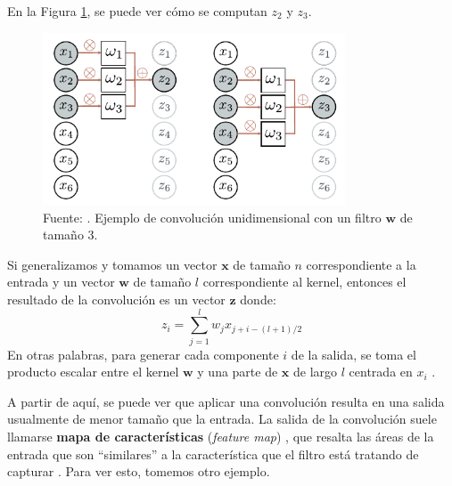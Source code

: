 \documentclass[../../main.tex]{subfiles}
\begin{document}
En la Figura \ref{fig:conv1d-example}, se puede ver cómo se computan \(z_2\) y \(z_3\).

\begin{figure}
    \centering
    \includegraphics[width=0.8\textwidth]{figs/conv1d-example1.png}
    \caption{Fuente: \cite{prince2024understanding}. Ejemplo de convolución unidimensional
    con un filtro \(\bm{w}\) de tamaño 3.}
    \label{fig:conv1d-example}
\end{figure}

Si generalizamos y tomamos un vector \(\mathbf{x}\) de tamaño \(n\) correspondiente
a la entrada y un vector \(\mathbf{w}\) de tamaño \(l\) correspondiente al kernel,
entonces el resultado de la convolución es un vector \(\mathbf{z}\) donde:
\begin{equation}
    z_i = \sum_{j=1}^l w_j x_{j+i-(l+1)/2}
    \label{eq:convolution}
\end{equation}
En otras palabras, para generar cada componente \(i\) de la salida, se toma el producto
escalar entre el kernel \(\mathbf{w}\) y una parte de \(\mathbf{x}\) de largo \(l\)
centrada en \(x_i\) \cite{ai-a-modern-approach}.

A partir de aquí, se puede ver que aplicar una convolución resulta en una salida
usualmente de menor tamaño que la entrada. La salida de la convolución suele llamarse
\textbf{mapa de características} (\textit{feature map}) \cite{deep-learning}, que resalta
las áreas de la entrada que son ``similares'' a la característica que el filtro está
tratando de capturar \cite{hands-on-ML-sklearn-tf}. Para ver esto, tomemos otro ejemplo.
\end{document}
